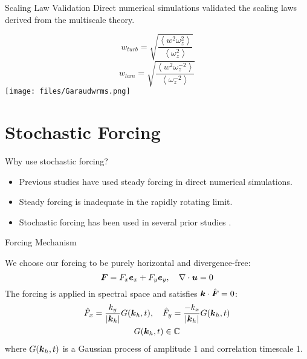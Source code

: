 \documentclass{beamer}
\begin{document}
\begin{frame}{Scaling Law Validation}
    Direct numerical simulations validated the scaling laws derived from the multiscale theory. 

        {\small
        {\color{blue}
        \[
            w_{turb} =
            \sqrt{\frac{\left<w^2\omega_z^2\right>}{\left<\omega_z^2\right>}}
        \]
        }{\color{red}
        \[
            w_{lam} =
            \sqrt{\frac{\left<w^2\omega_z^{-2}\right>}{\left<\omega_z^{-2}\right>}}
        \]
        }}
    \emp
        \centering
        \texttt{[image: files/Garaudwrms.png]}
    \emp
    
\end{frame}


\section{Stochastic Forcing}

\begin{frame}{Why use stochastic forcing?}

    \begin{itemize}
    \item Previous studies \citep{Copeal2020,Garaud2020,Garaudal2024} have used steady forcing in direct numerical simulations.
    \item Steady forcing is inadequate in the rapidly rotating limit.%
    \item Stochastic forcing has been used in several prior studies \citep{HerringMetais1989,WaiteBartello2004,WaiteBartello2006,Lindbord2006,Maffioli_Brethouwer_Lindborg_2016,Waite2017}. 
    \end{itemize}

\end{frame}

\begin{frame}{Forcing Mechanism}

    We choose our forcing to be purely horizontal and divergence-free:
    \[
        \boldsymbol{F} = F_x\boldsymbol{e}_x + F_y\boldsymbol{e}_y, \quad \nabla \cdot \boldsymbol{u} = 0
    \]
    The forcing is applied in spectral space and satisfies $\boldsymbol{k} \cdot \hat{\boldsymbol{F}} = 0$:
    \begin{gather*}
        \hat{F}_x = \frac{k_y}{|\boldsymbol{k}_h|}G(\boldsymbol{k}_h,t), \quad \hat{F}_y = \frac{-k_x}{|\boldsymbol{k}_h|}G(\boldsymbol{k}_h,t)\\
        G(\boldsymbol{k}_h,t) \in \mathbb{C}
    \end{gather*}
    where $G(\boldsymbol{k}_h,t)$ is a Gaussian process of amplitude 1 and correlation timescale 1. 

\end{frame}
\end{document}
